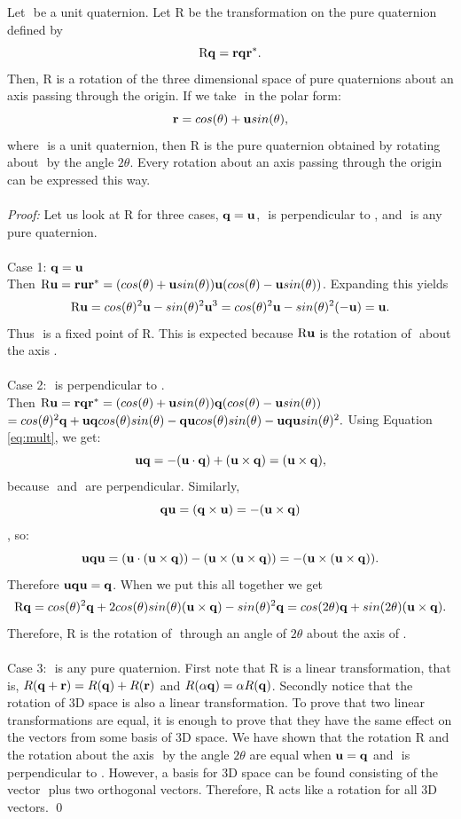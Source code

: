 \begin{thm}
Let \qr$ $ be a unit quaternion. Let R be the transformation on the pure quaternion \qq$ $ defined by $$ \text{R}\text{\textbf{q}} = \text{\textbf{r}} \text{\textbf{q}} \text{\textbf{r}}^*.$$
Then, R is a rotation of the three dimensional space of pure quaternions about an axis passing through the origin.
If we take \qr$ $ in the polar form: $$ \text{\textbf{r}} = cos(\theta) + \text{\textbf{u}} sin(\theta), $$ where \qu$ $ is a unit quaternion, then R\qq$ $ is the pure quaternion obtained by rotating \qq$ $ about \qu$ $ by the angle $2\theta$.
Every rotation about an axis passing through the origin can be expressed this way.
\\ \\ \noindent \textit{Proof:} Let us look at R\qq$ $ for three cases, $\text{\textbf{q}}=\text{\textbf{u}}$, \qq$ $ is perpendicular to \qu$ $, and \qq$ $ is any pure quaternion.
\\ \\ Case 1: $\text{\textbf{q}} = \text{\textbf{u}}$
\\ Then $\text{R}\text{\textbf{u}} = \text{\textbf{r}} \text{\textbf{u}} \text{\textbf{r}}^* = (cos(\theta) + \text{\textbf{u}} sin(\theta)) \text{\textbf{u}} (cos(\theta) - \text{\textbf{u}} sin(\theta))$.
Expanding this yields $$ \text{R}\text{\textbf{u}} = cos(\theta)^2\text{\textbf{u}} - sin(\theta)^2 \text{\textbf{u}}^3 = cos(\theta)^2 \text{\textbf{u}} - sin(\theta)^2 (-\text{\textbf{u}}) = \text{\textbf{u}}.$$
Thus \qu$ $ is a fixed point of R.
This is expected because $\text{R}\text{\textbf{u}}$ is the rotation of \qu$ $ about the axis \qu.
\\ \\ Case 2: \qq$ $ is perpendicular to \qu.
\\ Then $\text{R}\text{\textbf{u}} = \text{\textbf{r}} \text{\textbf{q}} \text{\textbf{r}}^* = (cos(\theta) + \text{\textbf{u}} sin(\theta))\text{\textbf{q}} (cos(\theta) - \text{\textbf{u}} sin(\theta))$
\\ $ = cos(\theta)^2 \text{\textbf{q}} + \text{\textbf{u}} \text{\textbf{q}} cos(\theta)sin(\theta) - \text{\textbf{q}} \text{\textbf{u}} cos(\theta) sin(\theta) - \text{\textbf{u}} \text{\textbf{q}} \text{\textbf{u}} sin(\theta)^2.$
Using Equation \ref{eq:mult}, we get: $$ \text{\textbf{u}} \text{\textbf{q}} = -(\text{\textbf{u}} \cdot \text{\textbf{q}}) + (\text{\textbf{u}} \times \text{\textbf{q}}) = (\text{\textbf{u}} \times \text{\textbf{q}}),$$ because \qu$ $ and \qq$ $ are perpendicular.
Similarly, $$ \text{\textbf{q}} \text{\textbf{u}} = (\text{\textbf{q}} \times \text{\textbf{u}}) = -(\text{\textbf{u}} \times \text{\textbf{q}})$$, so: $$ \text{\textbf{u}} \text{\textbf{q}} \text{\textbf{u}} = (\text{\textbf{u}} \cdot (\text{\textbf{u}} \times \text{\textbf{q}})) - (\text{\textbf{u}} \times (\text{\textbf{u}} \times \text{\textbf{q}})) = -(\text{\textbf{u}} \times(\text{\textbf{u}} \times \text{\textbf{q}})).$$
Therefore $ \text{\textbf{u}} \text{\textbf{q}} \text{\textbf{u}} = \text{\textbf{q}}$.
When we put this all together we get $$ \text{R}\text{\textbf{q}} = cos(\theta)^2 \text{\textbf{q}} + 2 cos(\theta)sin(\theta)(\text{\textbf{u}} \times \text{\textbf{q}}) - sin(\theta)^2 \text{\textbf{q}} \\ = cos(2\theta)\text{\textbf{q}} + sin(2\theta)(\text{\textbf{u}} \times \text{\textbf{q}}).$$
Therefore, R\qq$ $ is the rotation of \qq$ $ through an angle of $2\theta$ about the axis of \qu.
\\ \\ Case 3: \qq$ $ is any pure quaternion.
First note that R is a linear transformation, that is, $R(\text{\textbf{q}} + \text{\textbf{r}}) = R(\text{\textbf{q}}) + R(\text{\textbf{r}})$ and $R(\alpha\text{\textbf{q}}) = \alpha R(\text{\textbf{q}})$.
Secondly notice that the rotation of 3D space is also a linear transformation.
To prove that two linear transformations are equal, it is enough to prove that they have the same effect on the vectors from some basis of 3D space.
We have shown that the rotation R and the rotation about the axis \qu$ $ by the angle $2\theta$ are equal when $\text{\textbf{u}} = \text{\textbf{q}}$ and \qu$ $ is perpendicular to \qu.
However, a basis for 3D space can be found consisting of the vector \qu$ $ plus two orthogonal vectors.
Therefore, R acts like a rotation for all 3D vectors. \qed

\end{thm}
